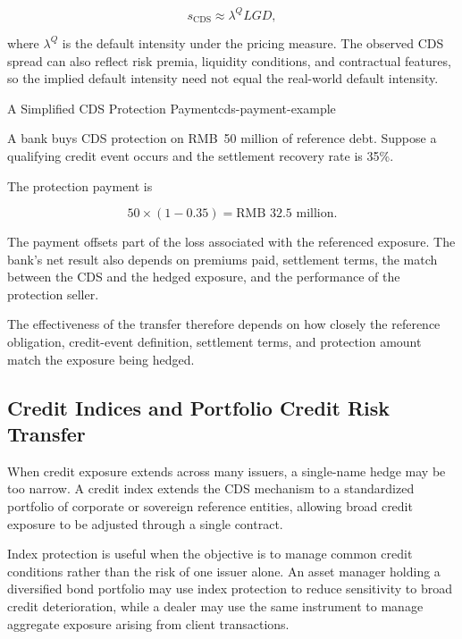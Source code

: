 \begin{equation}
s_{\mathrm{CDS}}
\approx
\lambda^{Q}LGD,
\label{eq:ch19-cds-hazard-approx}
\end{equation}

where \(\lambda^{Q}\) is the default intensity under the pricing measure. The observed CDS spread can also reflect risk premia, liquidity conditions, and contractual features, so the implied default intensity need not equal the real-world default intensity.


\begin{example}{A Simplified CDS Protection Payment}{cds-payment-example}

A bank buys CDS protection on RMB~50 million of reference debt. Suppose a qualifying credit event occurs and the settlement recovery rate is 35\%.

The protection payment is

$$
50\times(1-0.35)
=
\text{RMB~} 32.5 \text{ million}.
$$

The payment offsets part of the loss associated with the referenced exposure. The bank's net result also depends on premiums paid, settlement terms, the match between the CDS and the hedged exposure, and the performance of the protection seller.

\end{example}

The effectiveness of the transfer therefore depends on how closely the reference obligation, credit-event definition, settlement terms, and protection amount match the exposure being hedged.


\subsection[Credit Indices and Portfolio Credit Risk Transfer]{Credit Indices and Portfolio Credit Risk Transfer}

When credit exposure extends across many issuers, a single-name hedge may be too narrow. A credit index extends the CDS mechanism to a standardized portfolio of corporate or sovereign reference entities, allowing broad credit exposure to be adjusted through a single contract.

Index protection is useful when the objective is to manage common credit conditions rather than the risk of one issuer alone. An asset manager holding a diversified bond portfolio may use index protection to reduce sensitivity to broad credit deterioration, while a dealer may use the same instrument to manage aggregate exposure arising from client transactions.


